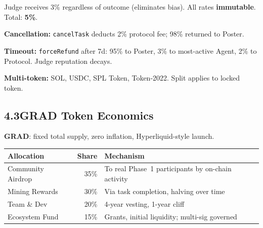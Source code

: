\documentclass[11pt,a4paper]{article}
\begin{document}
\begin{center}
\end{center}

Judge receives 3\% regardless of outcome (eliminates bias). All rates \textbf{immutable}. Total: \textbf{5\%}.

\textbf{Cancellation:} \texttt{cancelTask} deducts 2\% protocol fee; 98\% returned to Poster.

\textbf{Timeout:} \texttt{forceRefund} after 7d: 95\% to Poster, 3\% to most-active Agent, 2\% to Protocol. Judge reputation decays.

\textbf{Multi-token:} SOL, USDC, SPL Token, Token-2022. Split applies to locked token.

\subsection{4.3\quad GRAD Token Economics}

\textbf{GRAD}: fixed total supply, zero inflation, Hyperliquid-style launch.

\begin{table}[H]\centering\small
\begin{tabular}{@{}lrl@{}}
\toprule
\textbf{Allocation} & \textbf{Share} & \textbf{Mechanism} \\
\midrule
Community Airdrop & 35\% & To real Phase~1 participants by on-chain activity \\
Mining Rewards & 30\% & Via task completion, halving over time \\
Team \& Dev & 20\% & 4-year vesting, 1-year cliff \\
Ecosystem Fund & 15\% & Grants, initial liquidity; multi-sig governed \\
\bottomrule
\end{tabular}
\end{table}
\end{document}
